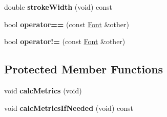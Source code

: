 \begin{DoxyCompactItemize}
\item 
double {\bfseries stroke\+Width} (void) const \hypertarget{classFont_a1fc0aff1181216101f3fba9cd182132e}{}\label{classFont_a1fc0aff1181216101f3fba9cd182132e}

\item 
bool {\bfseries operator==} (const \hyperlink{classFont}{Font} \&other)\hypertarget{classFont_af3d7892204120c7f7363fa94e44c0fcb}{}\label{classFont_af3d7892204120c7f7363fa94e44c0fcb}

\item 
bool {\bfseries operator!=} (const \hyperlink{classFont}{Font} \&other)\hypertarget{classFont_a90b10c4891689a1fe14fd645be2bc5e0}{}\label{classFont_a90b10c4891689a1fe14fd645be2bc5e0}

\end{DoxyCompactItemize}
\subsection*{Protected Member Functions}
\begin{DoxyCompactItemize}
\item 
void {\bfseries calc\+Metrics} (void)\hypertarget{classFont_a00798e79cc476774b00f6b541ed2c8c2}{}\label{classFont_a00798e79cc476774b00f6b541ed2c8c2}

\item 
void {\bfseries calc\+Metrics\+If\+Needed} (void) const \hypertarget{classFont_ad88cb3405a0aa457f583fab7ea359503}{}\label{classFont_ad88cb3405a0aa457f583fab7ea359503}

\end{DoxyCompactItemize}

